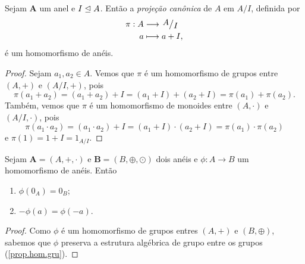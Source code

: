 \begin{ex}
	Sejam $\bm A$ um anel e $I \mathrel{\unlhd} A$. Então a \emph{projeção canônica} de $A$ em $A/I$, definida por
	\begin{align*}
	\func{\pi}{A}{\quo{A}{I}}{a}{a+I},
	\end{align*}
é um homomorfismo de anéis.
\end{ex}
\begin{proof}
	Sejam $a_1,a_2 \in A$. Vemos que $\pi$ é um homomorfismo de grupos entre $(A,+)$ e $(A/I,+)$, pois
	\begin{equation*}
	\pi(a_1+a_2) = (a_1+a_2)+I = (a_1+I)+(a_2+I) = \pi(a_1)+\pi(a_2).
	\end{equation*}
Também, vemos que $\pi$ é um homomorfismo de monoides entre $(A,\cdot)$ e $(A/I,\cdot)$, pois
	\begin{equation*}
	\pi(a_1 \cdot a_2) = (a_1 \cdot a_2)+I = (a_1+I) \cdot (a_2+I) = \pi(a_1) \cdot \pi(a_2)
	\end{equation*}
e $\pi(1)=1+I=1_{A/I}$.
\end{proof}

\begin{coro}
	Sejam $\bm A=(A,+,\cdot)$ e $\bm B=(B,\oplus,\odot)$ dois anéis e $\phi: A \to B$ um homomorfismo de anéis. Então
	\begin{enumerate}
	\item $\phi(0_A)=0_B$;
	\item $-\phi(a)=\phi(-a)$.
	\end{enumerate}
\end{coro}
\begin{proof}
	Como $\phi$ é um homomorfismo de grupos entres $(A,+)$ e $(B,\oplus)$, sabemos que $\phi$ preserva a estrutura algébrica de grupo entre os grupos (\ref{prop.hom.gru}).
\end{proof}

